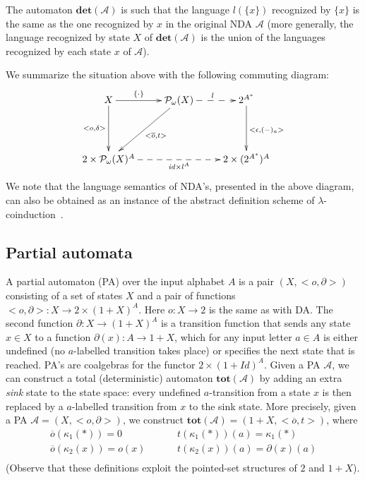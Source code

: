 \documentclass{LMCS}
\def\pow#1{{\mathcal P_\omega}#1}
\begin{document}
The automaton
$\mathbf{det}(\mathcal A)$  is such that the language $l(\{x\})$
recognized by $\{x\}$ is the same as the one recognized by $x$ in
the original NDA $\mathcal A$ (more generally, the language
recognized by state $X$ of $\mathbf{det}(\mathcal A)$ is the union
of the languages recognized by each state $x$ of $\mathcal A$).



We summarize the situation above with the following commuting diagram:
\[
\xymatrix@R=1.5cm{ X \ar[d]_-{<o,\delta>}\ar@{->}[r]^-{\{\cdot\}}&
\pow(X)\ar[dl]^-{<\overline o,t>}\ar@{-->}^{l}[r] & 2^{A^*}\ar[d]^{<\epsilon, (-)_a>}\\
2\times \pow(X)^A\ar@{-->}[rr]_-{\mathit{id} \times l^A} && 2\times (2^{A^*})^A }
\]
We note that the language semantics of NDA's,
presented in the above diagram, can also be obtained as an instance of
the abstract definition scheme of $\lambda$-coinduction~\cite{bartels,jacobs05}.
\subsection{Partial automata}
A partial automaton (PA) over the input alphabet $A$ is a pair
$(X,<o,\partial>)$ consisting of a set of states $X$ and a pair of
functions $<o,\partial> \colon X \to 2\times (1+X)^A$.
Here $o\colon X \to
2$ is the same as with DA. The second function $\partial \colon X\to (1+X)^A$ is
a transition function that sends any state $x \in X$ to a function
$\partial(x)\colon A \to 1+X$, which for any input letter $a \in A$
is either undefined (no $a$-labelled transition takes place)
or specifies the next state that is reached.
 PA's are coalgebras for the functor
$2\times (1+\mathit{Id})^A$.  Given a PA $\mathcal A$, we can
construct a total (deterministic) automaton
$\mathbf{tot}(\mathcal A)$ by adding an extra {\em sink} state to
the state space: every undefined $a$-transition from a state $x$ is then
replaced by a $a$-labelled transition from $x$ to the sink state.
More precisely, given a  PA $\mathcal A =(X,<o,\partial>)$, we construct
$\mathbf{tot}(\mathcal A) = (1+X, <\overline o, t>)$,
where
\[
\begin{array}{l}
\overline o(\kappa_1(*)) = 0\\
 \overline o(\kappa_2(x)) = o(x)\\
\end{array}\hspace{1cm}
\begin{array}{l}
t(\kappa_1(*))(a) = \kappa_1(*)\\
t(\kappa_2(x))(a) = \partial(x)(a)\\
\end{array}
\]
(Observe that these definitions exploit the pointed-set structures of $2$ and $1+X$).
\end{document}
